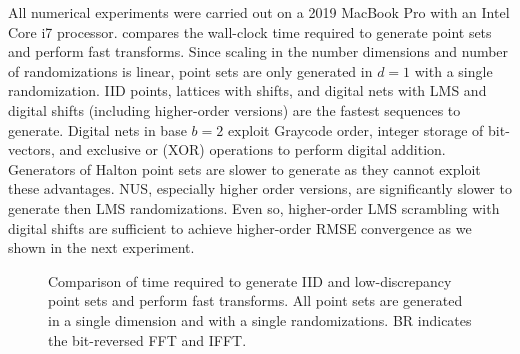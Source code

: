 \documentclass[acmsmall]{acmart}
\begin{document}
All numerical experiments were carried out on a 2019 MacBook Pro with an Intel Core i7 processor.  compares the wall-clock time required to generate point sets and perform fast transforms. Since scaling in the number dimensions and number of randomizations is linear, point sets are only generated in $d=1$ with a single randomization. IID points, lattices with shifts, and digital nets with LMS and digital shifts (including higher-order versions) are the fastest sequences to generate. Digital nets in base $b=2$ exploit Graycode order, integer storage of bit-vectors, and exclusive or (XOR) operations to perform digital addition. Generators of Halton point sets are slower to generate as they cannot exploit these advantages. NUS, especially higher order versions, are significantly slower to generate then LMS randomizations. Even so, higher-order LMS scrambling with digital shifts are sufficient to achieve higher-order RMSE convergence as we shown in the next experiment.  

\begin{figure}%
    \centering
    \caption{Comparison of time required to generate IID and low-discrepancy point sets and perform fast transforms. All point sets are generated in a single dimension and with a single randomizations. BR indicates the bit-reversed FFT and IFFT.}
    \Description[]{}
    \label{fig:timing}
\end{figure}
\end{document}
